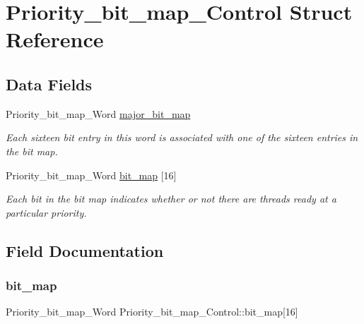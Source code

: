 \hypertarget{structPriority__bit__map__Control}{}\section{Priority\+\_\+bit\+\_\+map\+\_\+\+Control Struct Reference}
\label{structPriority__bit__map__Control}
\subsection*{Data Fields}
\begin{DoxyCompactItemize}
\item 
\mbox{\label{structPriority__bit__map__Control_a1940f16466690caf4c2d3cb357a7e54f}} 
Priority\+\_\+bit\+\_\+map\+\_\+\+Word \mbox{\hyperlink{structPriority__bit__map__Control_a1940f16466690caf4c2d3cb357a7e54f}{major\+\_\+bit\+\_\+map}}
\begin{DoxyCompactList}\small\item\em Each sixteen bit entry in this word is associated with one of the sixteen entries in the bit map. \end{DoxyCompactList}\item 
Priority\+\_\+bit\+\_\+map\+\_\+\+Word \mbox{\hyperlink{structPriority__bit__map__Control_a50632ff45f069e7b8e69a921f5aa4057}{bit\+\_\+map}} \mbox{[}16\mbox{]}
\begin{DoxyCompactList}\small\item\em Each bit in the bit map indicates whether or not there are threads ready at a particular priority. \end{DoxyCompactList}\end{DoxyCompactItemize}


\subsection{Field Documentation}
\mbox{\label{structPriority__bit__map__Control_a50632ff45f069e7b8e69a921f5aa4057}} 
\subsubsection{\texorpdfstring{bit\_map}{bit\_map}}
{\footnotesize\ttfamily Priority\+\_\+bit\+\_\+map\+\_\+\+Word Priority\+\_\+bit\+\_\+map\+\_\+\+Control\+::bit\+\_\+map\mbox{[}16\mbox{]}}



